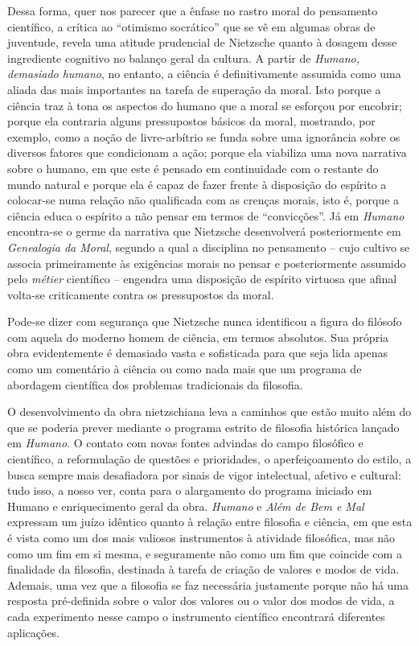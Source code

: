 \documentclass[
	12pt,				%
	openright,			%
	oneside,			%
	a4paper,			%
	english,			%
	french,				%
	spanish,			%
	brazil				%
	]{abntex2}
\begin{document}
	Dessa forma, quer nos parecer que a ênfase no rastro moral do pensamento científico, a crítica ao “otimismo socrático” que se vê em algumas obras de juventude, revela uma atitude prudencial de Nietzsche quanto à dosagem desse ingrediente cognitivo no balanço geral da cultura. A partir de \textit{Humano, demasiado humano}, no entanto, a ciência é definitivamente assumida como uma aliada das mais importantes na tarefa de superação da moral. Isto porque a ciência traz à tona os aspectos do humano que a moral se esforçou por encobrir; porque ela contraria alguns pressupostos básicos da moral, mostrando, por exemplo, como a noção de livre-arbítrio se funda sobre uma ignorância sobre os diversos fatores que condicionam a ação; porque ela viabiliza uma nova narrativa sobre o humano, em que este é pensado em continuidade com o restante do mundo natural e porque ela é capaz de fazer frente à disposição do espírito a colocar-se numa relação não qualificada com as crenças morais, isto é, porque a ciência educa o espírito a não pensar em termos de “convicções”. Já em \textit{Humano} encontra-se o germe da narrativa que Nietzsche desenvolverá posteriormente em \textit{Genealogia da Moral}, segundo a qual a disciplina no pensamento – cujo cultivo se associa primeiramente às exigências morais no pensar e posteriormente assumido pelo \textit{métier} científico – engendra uma disposição de espírito virtuosa que afinal volta-se criticamente contra os pressupostos da moral.

Pode-se dizer com segurança que Nietzsche nunca identificou a figura do filósofo com aquela do moderno homem de ciência, em termos absolutos. Sua própria obra evidentemente é demasiado vasta e sofisticada para que seja lida apenas como um comentário à ciência ou como nada mais que um programa de abordagem científica dos problemas tradicionais da filosofia.

	O desenvolvimento da obra nietzschiana leva a caminhos que estão muito além do que se poderia prever mediante o programa estrito de filosofia histórica lançado em \textit{Humano}. O contato com novas fontes advindas do campo filosófico e científico, a reformulação de questões e prioridades, o aperfeiçoamento do estilo, a busca sempre mais desafiadora por sinais de vigor intelectual, afetivo e cultural: tudo isso, a nosso ver, conta para o alargamento do programa iniciado em Humano e enriquecimento geral da obra. \textit{Humano} e \textit{Além de Bem e Mal} expressam um juízo idêntico quanto à relação entre filosofia e ciência, em que esta é vista como um dos mais valiosos instrumentos à atividade filosófica, mas não como um fim em si mesma, e seguramente não como um fim que coincide com a finalidade da filosofia, destinada à tarefa de criação de valores e modos de vida. Ademais, uma vez que a filosofia se faz necessária justamente porque não há uma resposta pré-definida sobre o valor dos valores ou o valor dos modos de vida, a cada experimento nesse campo o instrumento científico encontrará diferentes aplicações.
	
\end{document}
